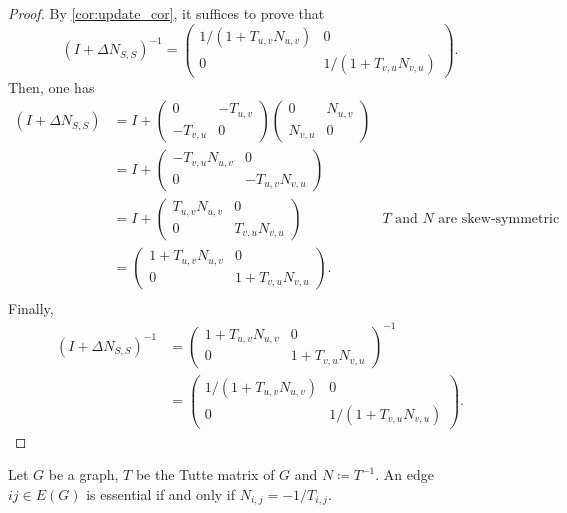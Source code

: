 \begin{proof}
By \cref{cor:update_cor}, it suffices to prove that 
\[
    (I + \Delta N_{S, S})^{-1} = 
    \begin{pmatrix}
        1 / (1 + T_{u, v}N_{u, v}) & 0 \\
        0 &  1 / (1 + T_{v, u}N_{v, u})
    \end{pmatrix}.
\]
Then, one has
\begin{align*}
    (I + \Delta N_{S, S}) &= I + 
    \begin{pmatrix} 0 & -T_{u,v} \\ -T_{v, u} & 0 \end{pmatrix} 
    \begin{pmatrix} 0 & N_{u, v} \\ N_{v, u} & 0\end{pmatrix} & \\
    &= I + 
    \begin{pmatrix} -T_{v, u}N_{u, v} & 0  \\ 0 & -T_{u, v}N_{v, u} \end{pmatrix} & \\
    &= I + 
    \begin{pmatrix} T_{u, v}N_{u, v} & 0  \\ 0 & T_{v, u}N_{v, u} \end{pmatrix} & \text{\(T\) and \(N\) are skew-symmetric} \\
    &= 
    \begin{pmatrix} 1 + T_{u, v}N_{u, v} & 0  \\ 0 & 1 + T_{v, u}N_{v, u} \end{pmatrix}. &  \\
\end{align*}
Finally, 
\begin{align*}
    (I + \Delta N_{S, S})^{-1} 
    &= \begin{pmatrix} 1 + T_{u, v}N_{u, v} & 0  \\ 0 & 1 + T_{v, u}N_{v, u} \end{pmatrix}^{-1} \\
    &= \begin{pmatrix} 1 / (1 + T_{u, v}N_{u, v}) & 0  \\ 0 & 1 / (1 + T_{v, u}N_{v, u}) \end{pmatrix}.
\end{align*}
\end{proof}

\begin{corollary}
    \label{cor:condition_edge_removal}
    Let \(G\) be a graph, \(T\) be the Tutte matrix of \(G\) and \(N \coloneqq T^{-1}\).
    An edge \(ij \in E(G)\) is essential if and only if \(N_{i,j} = -1/T_{i,j}\).
\end{corollary}

